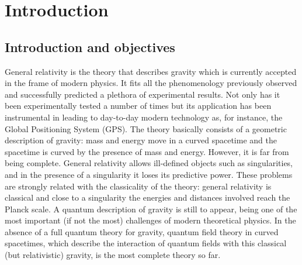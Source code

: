 
{\renewcommand{\thechapter}{}\renewcommand{\chaptername}{}
\addtocounter{chapter}{0}
\chapter*{Introduction}}


\section*{Introduction and objectives}

General relativity is the theory that describes gravity which is currently accepted in the frame of modern physics. It fits all the phenomenology previously observed and successfully predicted a plethora of experimental results. Not only has it been experimentally tested a number of times but its application has been instrumental in leading to day-to-day modern technology as, for instance, the Global Positioning System (GPS). The theory basically consists of  a geometric description of gravity: mass and energy move in a curved spacetime and the spacetime is curved by the presence of mass and energy. However, it is far from being complete. General relativity allows ill-defined objects such as singularities, and in the presence of a singularity it loses its predictive power. These problems are strongly related with the classicality of the theory: general relativity is classical and close to a singularity the energies and distances involved reach the Planck scale. A quantum description of gravity is still to appear, being one of the most important (if not the most) challenges of modern theoretical physics. In the absence of a full quantum theory for gravity, quantum field theory in curved spacetimes, which describe the interaction of quantum fields with this classical (but relativistic) gravity, is the most complete theory so far.


